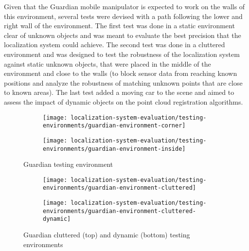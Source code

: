 Given that the Guardian mobile manipulator is expected to work on the walls of this environment, several tests were devised with a path following the lower and right wall of the environment. The first test was done in a static environment clear of unknown objects and was meant to evaluate the best precision that the localization system could achieve. The second test was done in a cluttered environment and was designed to test the robustness of the localization system against static unknown objects, that were placed in the middle of the environment and close to the walls (to block sensor data from reaching known positions and analyze the robustness of matching unknown points that are close to known areas). The last test added a moving car to the scene and aimed to assess the impact of dynamic objects on the point cloud registration algorithms.


\begin{figure}[H]
	\centering
	\begin{subfigure}[ht]{0.33\textwidth}
		\centering
		\texttt{[image: localization-system-evaluation/testing-environments/guardian-environment-corner]}
	\end{subfigure}
	\begin{subfigure}[ht]{0.33\textwidth}
		\centering
		\texttt{[image: localization-system-evaluation/testing-environments/guardian-environment-inside]}
	\end{subfigure}
	\caption{Guardian testing environment}
	\label{fig:localization-system-evaluation_guardian-tests-environment}
\end{figure}

\begin{figure}[H]
	\centering
	\begin{subfigure}[ht]{0.37\textwidth}
		\centering
		\texttt{[image: localization-system-evaluation/testing-environments/guardian-environment-cluttered]}
	\end{subfigure}
	\begin{subfigure}[ht]{0.37\textwidth}
		\centering
		\texttt{[image: localization-system-evaluation/testing-environments/guardian-environment-cluttered-dynamic]}
	\end{subfigure}
	\caption{Guardian cluttered (top) and dynamic (bottom) testing environments}
	\label{fig:localization-system-evaluation_guardian-tests-environment-cluttered}
\end{figure}



